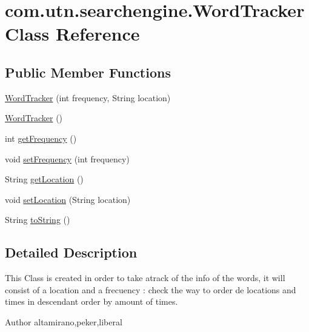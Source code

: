 \hypertarget{classcom_1_1utn_1_1searchengine_1_1_word_tracker}{\section{com.\-utn.\-searchengine.\-Word\-Tracker \-Class \-Reference}
\label{classcom_1_1utn_1_1searchengine_1_1_word_tracker}
}
\subsection*{\-Public \-Member \-Functions}
\begin{DoxyCompactItemize}
\item 
\hyperlink{classcom_1_1utn_1_1searchengine_1_1_word_tracker_ad49d68c9308b2f425acffa28c0508517}{\-Word\-Tracker} (int frequency, \-String location)
\item 
\hyperlink{classcom_1_1utn_1_1searchengine_1_1_word_tracker_a0025b21da43115a6a65a3af63c66bc02}{\-Word\-Tracker} ()
\item 
int \hyperlink{classcom_1_1utn_1_1searchengine_1_1_word_tracker_aaefccf8b5fccf860c50c863b94ddaebe}{get\-Frequency} ()
\item 
void \hyperlink{classcom_1_1utn_1_1searchengine_1_1_word_tracker_a143d4223ece8505732ee4e46d6879f6b}{set\-Frequency} (int frequency)
\item 
\-String \hyperlink{classcom_1_1utn_1_1searchengine_1_1_word_tracker_ac244590c98b68789fb32d10c078195c6}{get\-Location} ()
\item 
void \hyperlink{classcom_1_1utn_1_1searchengine_1_1_word_tracker_a694ab41dc64b080bc22b289e28500bcd}{set\-Location} (\-String location)
\item 
\-String \hyperlink{classcom_1_1utn_1_1searchengine_1_1_word_tracker_a42bc3c43c6838865c19610aeebdd0b37}{to\-String} ()
\end{DoxyCompactItemize}


\subsection{\-Detailed \-Description}
\-This \-Class is created in order to take atrack of the info of the words, it will consist of a location and a frecuency \-: check the way to order de locations and times in descendant order by amount of times. \begin{DoxyAuthor}{\-Author}
altamirano,peker,liberal 
\end{DoxyAuthor}


